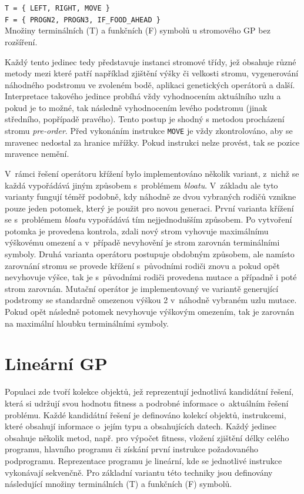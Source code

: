 \begin{center}
    \texttt{T = \{ LEFT, RIGHT, MOVE \}} \\
    \texttt{F = \{ PROGN2, PROGN3, IF\_FOOD\_AHEAD \}} \\[0.1cm]
    {\small Množiny terminálních (T) a funkčních (F) symbolů u stromového GP bez rozšíření.}
\end{center}
\vspace{0.3cm}

\noindent Každý tento jedinec tedy představuje instanci stromové třídy, jež obsahuje různé metody mezi které patří například zjištění výšky či velkosti stromu, vygenerování náhodného podstromu ve zvoleném bodě, aplikaci genetických operátorů a další. Interpretace takového jedince probíhá vždy vyhodnocením aktuálního uzlu a pokud je to možné, tak následně vyhodnocením levého podstromu (jinak středního, popřípadě pravého). Tento postup je shodný s metodou procházení stromu \emph{pre-order}. Před vykonáním instrukce \texttt{MOVE} je vždy zkontrolováno, aby se mravenec nedostal za hranice mřížky. Pokud instrukci nelze provést, tak se pozice mravence nemění.

V~rámci řešení operátoru křížení bylo implementováno několik variant, z~nichž se každá vypořádává jiným způsobem s~problémem \emph{bloatu}. V~základu ale tyto varianty fungují téměř podobně, kdy náhodně ze dvou vybraných rodičů vznikne pouze jeden potomek, který je použit pro novou generaci. První varianta křížení se s~problémem \emph{bloatu} vypořádává tím nejjednodušším způsobem. Po vytvoření potomka je provedena kontrola, zdali nový strom vyhovuje maximálnímu výškovému omezení a v~případě nevyhovění je strom zarovnán terminálními symboly. Druhá varianta operátoru postupuje obdobným způsobem, ale namísto zarovnání stromu se provede křížení s~původními rodiči znovu a pokud opět nevyhovuje výšce, tak je s~původními rodiči provedena mutace a případně i poté strom zarovnán.
Mutační operátor je implementovaný ve variantě generující podstromy se standardně omezenou výškou 2 v~náhodně vybraném uzlu mutace. Pokud opět následně potomek nevyhovuje výškovým omezením, tak je zarovnán na maximální hloubku terminálními symboly.

\section{Lineární GP}
Populaci zde tvoří kolekce objektů, jež reprezentují jednotlivá kandidátní řešení, která si udržují svou hodnotu fitness a podrobné informace o~aktuálním řešení problému. Každé kandidátní řešení je definováno kolekcí objektů, instrukcemi, které obsahují informace o~jejím typu a obsahujících datech. Každý jedinec obsahuje několik metod, např. pro výpočet fitness, vložení zjištění délky celého programu, hlavního programu či získání první instrukce požadovaného podprogramu. Reprezentace programu je lineární, kde se jednotlivé instrukce vykonávají sekvenčně. Pro základní variantu této techniky jsou definovány následující množiny terminálních (T) a funkčních (F) symbolů. 

